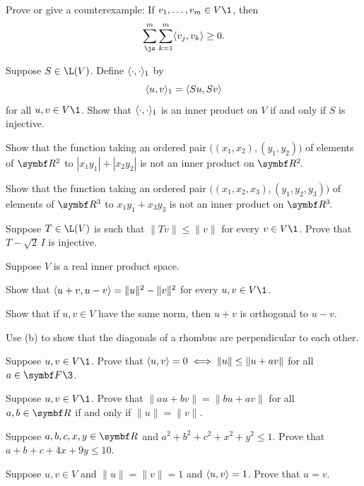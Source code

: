 \begin{exercises}

\exercise
Prove or give a counterexample: If $v_1, \dots, v_m \in V\1$, then
\[
\sum_{\js}^m \sum_{k=1}^m \ip{v_j, v_k} \ge 0.
\]
\vspace{-12bp}


\exercise
Suppose $S \in \L(V)$. Define $\langle\cdot, \cdot\rangle_1$ by
\[
\langle u, v\rangle_1 = \langle Su, Sv\rangle
\]
for all $u, v \in V\1$. Show that $\langle\cdot, \cdot\rangle_1$ is an inner product on $V$ if and only if $S$ is injective.


\exercise
\begin{SUBtheorem}
\item
Show that the function taking an ordered pair $\bigl( (x_1, x_2), (y_1, y_2) \bigr)$ of elements of $\R2$ to $|x_1 y_1| + |x_2 y_2|$ is not an inner product on $\RR2$.
\item
Show that the function taking an ordered pair $\bigl( (x_1, x_2, x_3), (y_1, y_2, y_3) \bigr)$ of elements of $\R3$ to $x_1 y_1 + x_3 y_3$ is not an inner product on $\RR3$.
\end{SUBtheorem}


\exercise
Suppose $T \in \L(V)$ is such that $\|Tv\| \le \|v\|$ for every $v \in V\1$. Prove that $ T - \sqrt{2}\, I$ is injective.


\exercise
Suppose $V$ is a real inner product space.
\begin{subtheorem}
\item
Show that $\langle u + v, u - v\rangle = \| u \|^2 - \| v \|^2$ for every $u, v \in V\1$.
\item
Show that if $u, v \in V$ have the same norm, then $u+v$ is orthogonal to $u-v$.
\item
Use (b) to show that the diagonals of a rhombus are perpendicular to each other.
\end{subtheorem}
\exercisesubtheoremend


\exercise
Suppose $u, v \in V\1$.  Prove that $\langle u,v\rangle = 0 \iff
\|u\| \le \|u + av\|
$
for all $a \in \F{}\3$.\label{orthognorm}


\exercise
Suppose $u, v \in V\1$. Prove that $\|au + bv\| = \|bu + av\|$ for all $a, b \in \R{}$ if and only if $\|u\| = \|v\|$.


\exercise
Suppose $a,b,c,x, y \in \R{}$ and $a^2 + b^2 + c^2 + x^2 + y^2 \le 1$. Prove that $a + b + c +4x + 9y \le 10$.


\exercise
Suppose $u, v \in V$ and $\| u \| = \|v \| = 1$ and $\langle u, v\rangle = 1$. Prove that $u = v$.



\end{exercises}
